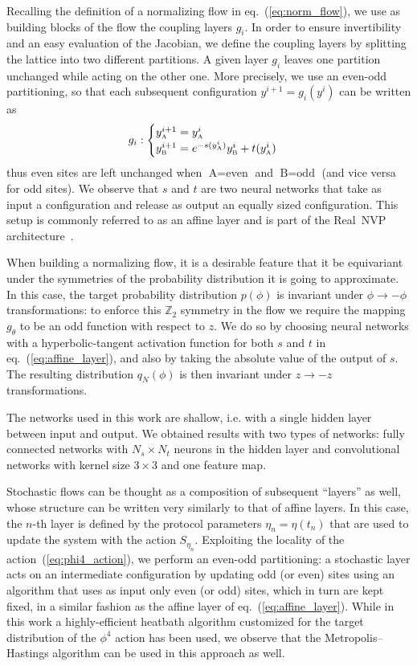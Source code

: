 \documentclass[11pt]{article}
\begin{document}
Recalling the definition of a normalizing flow in eq.~(\ref{eq:norm_flow}), we use as building blocks of the flow the coupling layers $g_i$. In order to ensure invertibility and an easy evaluation of the Jacobian, we define the coupling layers by splitting the lattice into two different partitions. A given layer $g_i$ leaves one partition unchanged while acting on the other one. More precisely, we use an even-odd partitioning, so that each subsequent configuration $y^{i+1} = g_i(y^{i})$ can be written as
\begin{align}
\label{eq:affine_layer}
g_i :
\begin{cases}
 y^{i+1}_{\mbox{\tiny{A}}} = y^{i}_{\mbox{\tiny{A}}} \\
 y^{i+1}_{\mbox{\tiny{B}}} = e^{-s(y^{i}_{\mbox{\tiny{A}}})} y^{i}_{\mbox{\tiny{B}}} + t(y^{i}_{\mbox{\tiny{A}}})
 \end{cases}
\end{align}
thus even sites are left unchanged when $\mbox{A} = \mbox{even}$ and $\mbox{B} = \mbox{odd}$ (and vice versa for odd sites). We observe that $s$ and $t$ are two neural networks that take as input a configuration and release as output an equally sized configuration. This setup is commonly referred to as an affine layer and is part of the Real~NVP architecture~\cite{Dinh:2016deu}. 

When building a normalizing flow, it is a desirable feature that it be equivariant under the symmetries of the probability distribution it is going to approximate. In this case, the target probability distribution $p(\phi)$ is invariant under $\phi \to -\phi$ transformations: to enforce this $\mathbb{Z}_2$ symmetry in the flow we require the mapping $g_\theta$ to be an odd function with respect to $z$. We do so by choosing neural networks with a hyperbolic-tangent activation function for both $s$ and $t$ in eq.~(\ref{eq:affine_layer}), and also by taking the absolute value of the output of $s$. The resulting distribution $q_N (\phi)$ is then invariant under $z \to -z$ transformations. 

The networks used in this work are shallow, i.e. with a single hidden layer between input and output. We obtained results with two types of networks: fully connected networks with $N_s \times N_t$ neurons in the hidden layer and convolutional networks with kernel size $3\times 3$ and one feature map.

Stochastic flows can be thought as a composition of subsequent ``layers'' as well, whose structure can be written very similarly to that of affine layers. In this case, the $n$-th layer is defined by the protocol parameters $\eta_n=\eta(t_n)$ that are used to update the system with the action $S_{\eta_n}$. Exploiting the locality of the action~(\ref{eq:phi4_action}), we perform an even-odd partitioning: a stochastic layer acts on an intermediate configuration by updating odd (or even) sites using an algorithm that uses as input only even (or odd) sites, which in turn are kept fixed, in a similar fashion as the affine layer of eq.~(\ref{eq:affine_layer}). While in this work a highly-efficient heatbath algorithm customized for the target distribution of the $\phi^4$ action has been used, we observe that the Metropolis--Hastings algorithm can be used in this approach as well.
\end{document}
